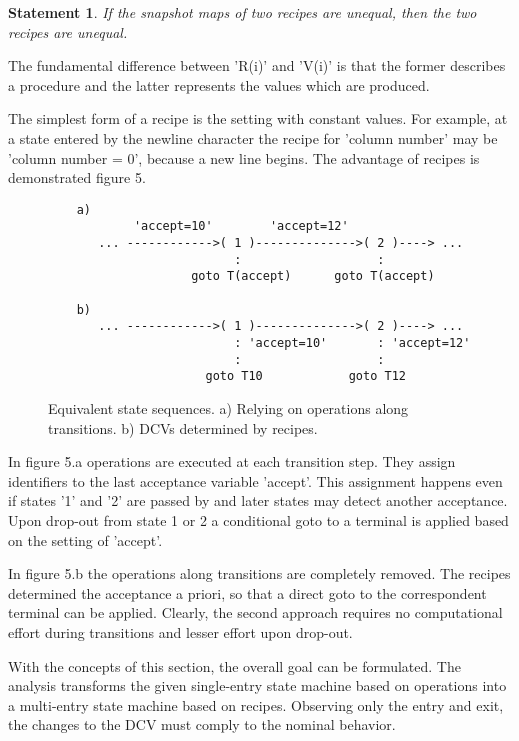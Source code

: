 \documentclass[12pt]{article}
\newtheorem{statement}{Statement}
\begin{document}
\begin{statement}
   If the snapshot maps of two recipes are unequal, then the two recipes
   are unequal.
\end{statement}

The fundamental difference between 'R(i)' and 'V(i)' is that the former describes
a procedure and the latter represents the values which are produced.

The simplest form of a recipe is the setting with constant values.  For
example, at a state entered by the newline character the recipe for 'column
number' may be 'column number = 0', because a new line begins. The advantage of
recipes is demonstrated figure 5.


\begin{figure}[htbp] \leavevmode
\begin{verbatim}
    a)        
            'accept=10'        'accept=12'        
       ... ------------>( 1 )-------------->( 2 )----> ...
                          :                   :
                    goto T(accept)      goto T(accept)

    b) 
       ... ------------>( 1 )-------------->( 2 )----> ...
                          : 'accept=10'       : 'accept=12'              
                          :                   :
                      goto T10            goto T12

\end{verbatim}
\caption{Equivalent state sequences. a) Relying on operations along
transitions. b) DCVs determined by recipes.}
\end{figure}

In figure 5.a operations are executed at each transition step. They assign
identifiers to the last acceptance variable 'accept'. This assignment happens
even if states '1' and '2' are passed by and later states may detect another
acceptance. Upon drop-out from state 1 or 2 a conditional goto to a terminal is
applied based on the setting of 'accept'. 

In figure 5.b the operations along transitions are completely removed. The
recipes determined the acceptance a priori, so that a direct goto to the
correspondent terminal can be applied.  Clearly, the second approach requires
no computational effort during transitions and lesser effort upon drop-out.

With the concepts of this section, the overall goal can be formulated. The
analysis transforms the given single-entry state machine based on operations
into a multi-entry state machine based on recipes. Observing only the entry and
exit, the changes to the DCV must comply to the nominal behavior. 
\end{document}
